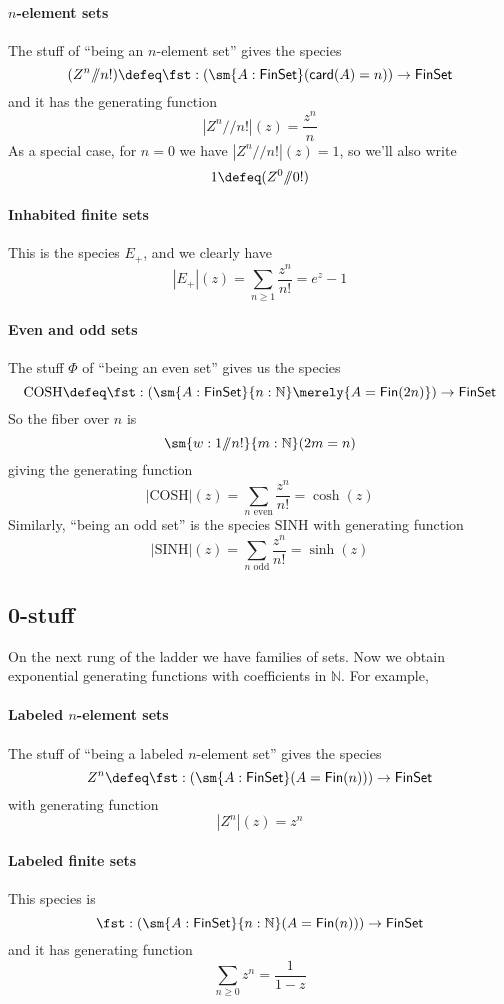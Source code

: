 \documentclass[fleqn]{article}
\newcommand{\card}{\mathsf{card}}
\newcommand{\gf}[1]{\abs{#1}\!(z)}
\newcommand{\fin}{\mathsf{Fin}}
\newcommand{\finset}{\mathsf{FinSet}}
\newcommand{\abs}[1]{\left\lvert #1 \right\rvert}
\newcommand{\sslash}{/\!\!/}
\theoremstyle{theorem}
\theoremstyle{definition}
\begin{document}
\paragraph{$n$-element sets}
The stuff of ``being an $n$-element set'' gives the species
\[
  (Z^{n} \sslash n!) \defeq 
  \fst : \left(
    \sm{A : \finset}(\card(A) = n)
  \right) \to \finset
\]
and it has the generating function
\[
  \gf{Z^{n} \sslash n!} = \frac{z^{n}}{n}
\]
As a special case, for $n = 0$ we have $\gf{Z^{n} \sslash n!} = 1$, so we'll
also write
\[
  1 \defeq (Z^{0} \sslash 0!)
\]


\paragraph{Inhabited finite sets}
This is the species $E_{+}$, and we clearly have
\[
  \gf{E_{+}} = \sum_{n\geq1}\frac{z^{n}}{n!} = e^{z} - 1
\]

\paragraph{Even and odd sets}
The stuff $\Phi$ of ``being an even set'' gives us the species
\[
  \mathrm{COSH} \defeq \fst :
  \left(\sm{A : \finset}{n:\mathbb{N}}\merely{A = \fin(2n)}\right)
  \to
  \finset
\]
So the fiber over $n$ is
\[
  \sm{w : 1 \sslash n!}{m:\mathbb{N}}(2m = n)
\]
giving the generating function
\[
  \gf{\mathrm{COSH}} = \sum_{\text{$n$ even}}\frac{z^{n}}{n!} = \cosh(z)
\]
Similarly, ``being an odd set'' is the species $\mathrm{SINH}$ with generating
function
\[
  \gf{\mathrm{SINH}} = \sum_{\text{$n$ odd}} \frac{z^{n}}{n!} = \sinh(z)
\]


\subsection{0-stuff}
On the next rung of the ladder we have families of sets.  Now we obtain
exponential generating functions with coefficients in $\mathbb{N}$.  For
example, 

\paragraph{Labeled $n$-element sets}
The stuff of ``being a labeled $n$-element set'' gives the species
\[
  Z^{n} \defeq \fst : \left(
    \sm{A : \finset} (A = \fin(n))
  \right) \to \finset
\]
with generating function
\[
  \gf{Z^{n}} = z^{n}
\]

\paragraph{Labeled finite sets}
This species is
\[
  \fst : \left(
    \sm{A : \finset}{n:\mathbb{N}}(A = \fin(n))
  \right) \to \finset
\]
and it has generating function
\[
  \sum_{n\geq0} z^{n} = \frac{1}{1 - z}
\]
\end{document}
